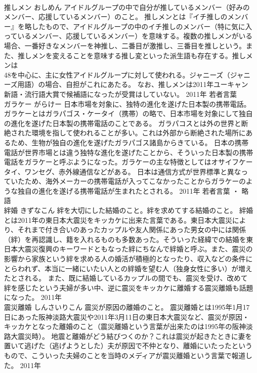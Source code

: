 \documentclass[8pt]{extreport}
\begin{document}
\begin{CJK}{UTF8}{min}
\\	推しメン	おしめん	アイドルグループの中で自分が推しているメンバー（好みのメンバー、応援しているメンバー）のこと。	推しメンとは『イチ推しのメンバー』を略したもので、アイドルグループの中のイチ推しのメンバー（特に気に入っているメンバー、応援しているメンバー）を意味する。複数の推しメンがいる場合、一番好きなメンバーを神推し、二番目が激推し、三番目を推しという。また、推しメンを変えることを意味する推し変といった派生語も存在する。推しメンは
\\	48を中心に、主に女性アイドルグループに対して使われる。ジャニーズ（ジャニーズ用語）の場合、自担がこれにあたる。 なお、推しメンは2011年ユーキャン新語・流行語大賞で候補語になったが受賞はしていない。	2011年	若者言葉	
\\	ガラケー	がらけー	日本市場を対象に、独特の進化を遂げた日本製の携帯電話。	ガラケーとはガラパゴス・ケータイ（携帯）の略で、日本市場を対象にして独自の進化を遂げた日本製の携帯電話のことである。 ガラパコスとは外の世界と断絶された環境を指して使われることが多い。これは外部から断絶された場所にあるため、生物が独自の進化を遂げたガラパゴス諸島からきている。 日本の携帯電話が世界市場とは違う独特な進化を遂げたことから、そういった日本製の携帯電話をガラケーと呼ぶようになった。ガラケーの主な特徴としてはオサイフケータイ、ワンセグ、赤外線通信などがある。 日本は通信方式が世界標準と異なっていたため、海外メーカーの携帯電話が入ってこなかったことからガラケーのような独自の進化を遂げる携帯電話が生まれたとされる。	2011年	若者言葉 ・ 略語	
\\	絆婚	きずなこん	絆を大切にした結婚のこと。絆を求めてする結婚のこと。	絆婚とは2011年の東日本大震災をキッカケに出来た言葉である。東日本大震災により、それまで付き合いのあったカップルや友人関係にあった男女の中には関係（絆）を再認識し、籍を入れるものも多数あった。そういった経緯での結婚を東日本大震災復興のキーワードともなった絆にちなんで絆婚と呼ぶ。また、震災の影響から家族という絆を求める人の婚活が積極的となったり、収入などの条件にとらわれず、本当に一緒にいたい人との絆婚を望む人（独身女性に多い）が増えたとされる。 また、既に結婚しているカップルの間でも、震災を受け、改めて絆を感じたという夫婦が多い中、逆に震災をキッカケに離婚する震災離婚も話題になった。	2011年	
\\	震災離婚	しんさいりこん	震災が原因の離婚のこと。	震災離婚とは1995年1月17日にあった阪神淡路大震災や2011年3月11日の東日本大震災など、震災が原因・キッカケとなった離婚のこと（震災離婚という言葉が出来たのは1995年の阪神淡路大震災時）。 地震と離婚がどう結びつくのか？これは震災が起きたときに妻を置いて逃げた（逃げようとした）夫が原因で不仲となり、離婚にいたったというもので、こういった夫婦のことを当時のメディアが震災離婚という言葉で報道した。	2011年	

\end{CJK}
\end{document}
